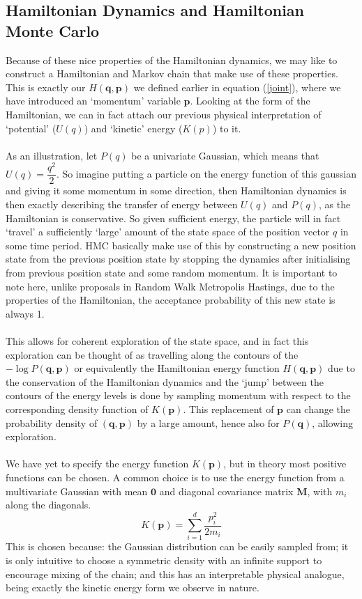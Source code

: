 \documentclass[11pt]{article}
\begin{document}
\subsection{Hamiltonian Dynamics and Hamiltonian Monte Carlo}
Because of these nice properties of the Hamiltonian dynamics, we may like to construct a Hamiltonian and Markov chain that make use of these properties. This is exactly our $H(\mathbf{q},\mathbf{p})$ we defined earlier in equation (\ref{joint}), where we have introduced an `momentum' variable $\mathbf{p}$. Looking at the form of the Hamiltonian, we can in fact attach our previous physical interpretation of `potential' ($U(q)$) and `kinetic' energy ($K(p)$) to it. 
\\
\\
As an illustration, let $P(q)$ be a univariate Gaussian, which means that $U(q)=\dfrac{q^2}{2}$. So imagine putting a particle on the energy function of this gaussian and giving it some momentum in some direction, then Hamiltonian dynamics is then exactly describing the transfer of energy between $U(q)$ and $P(q)$, as the Hamiltonian is conservative. So given sufficient energy, the particle will in fact `travel' a sufficiently `large' amount of the state space of the position vector $q$ in some time period. HMC basically make use of this by constructing a new position state from the previous position state by stopping the dynamics after initialising from previous position state and some random momentum. It is important to note here, unlike proposals in Random Walk Metropolis Hastings, due to the properties of the Hamiltonian, the acceptance probability of this new state is always 1. 
\\
\\
This allows for coherent exploration of the state space, and in fact this exploration can be thought of as travelling along the contours of the $-\log P(\mathbf{q},\mathbf{p})$ or equivalently the Hamiltonian energy function $H(\mathbf{q},\mathbf{p})$ due to the conservation of the Hamiltonian dynamics and the `jump' between the contours of the energy levels is done by sampling momentum with respect to the corresponding density function of $K(\mathbf{p})$. This replacement of $\mathbf{p}$ can change the probability density of $(\mathbf{q},\mathbf{p})$ by a large amount, hence also for $P(\mathbf{q})$, allowing exploration.
\\
\\
We have yet to specify the energy function $K(\mathbf{p})$, but in theory most positive functions can be chosen. A common choice is to use the energy function from a multivariate Gaussian with mean $\mathbf{0}$ and diagonal covariance matrix $\mathbf{M}$, with $m_{i}$ along the diagonals.
\begin{equation}
K(\mathbf{p}) = \sum_{i=1}^{d} \frac{p_{i}^{2}}{2m_{i}}
\end{equation}
This is chosen because: the Gaussian distribution can be easily sampled from; it is only intuitive to choose a symmetric density with an infinite support to encourage mixing of the chain; and this has an interpretable physical analogue, being exactly the kinetic energy form we observe in nature. 
\end{document}
